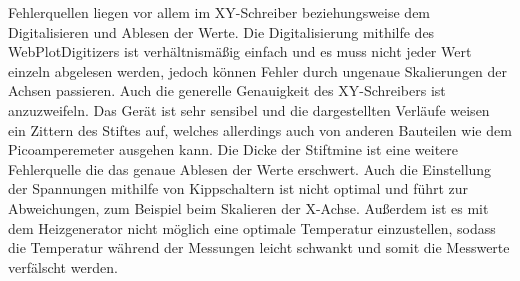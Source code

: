 Fehlerquellen liegen vor allem im XY-Schreiber beziehungsweise dem Digitalisieren und Ablesen der Werte.
Die Digitalisierung mithilfe des WebPlotDigitizers ist verhältnismäßig einfach und es muss nicht jeder Wert einzeln abgelesen werden, 
jedoch können Fehler durch ungenaue Skalierungen der Achsen passieren.
Auch die generelle Genauigkeit des XY-Schreibers ist anzuzweifeln. Das Gerät ist sehr sensibel und die dargestellten Verläufe weisen
ein Zittern des Stiftes auf, welches allerdings auch von anderen Bauteilen wie dem Picoamperemeter ausgehen kann.
Die Dicke der Stiftmine ist eine weitere Fehlerquelle die das genaue Ablesen der Werte erschwert.
Auch die Einstellung der Spannungen mithilfe von Kippschaltern ist nicht optimal und führt zur Abweichungen, zum Beispiel beim Skalieren der
X-Achse.
Außerdem ist es mit dem Heizgenerator nicht möglich eine optimale Temperatur einzustellen, sodass die Temperatur während der Messungen 
leicht schwankt und somit die Messwerte verfälscht werden.
\pagebreak



